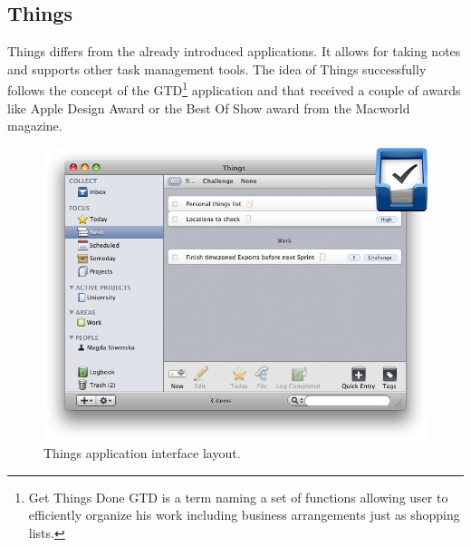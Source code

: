 \subsection{Things}\label{subsec:things} 
Things differs from the already introduced applications. It allows for taking notes and supports other task management tools. The idea of Things successfully follows the concept of the GTD\footnote{Get Things Done GTD is a term naming a set of functions allowing user to efficiently organize his work including business arrangements just as shopping lists.} application and that received a couple of awards like Apple Design Award or the Best Of Show award from the Macworld magazine. 
\begin{figure}[ht]
\begin{center}
\includegraphics[scale=0.38]{img/things_demo.png}
\caption{Things application interface layout.}
\label{fig:things_demo}
\end{center}
\end{figure}
 
